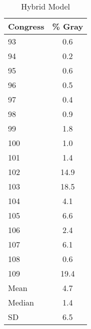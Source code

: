 \documentclass[12pt]{article}
\begin{document}
	\begin{table}[!htbp]
		\begin{center}
			\caption{Hybrid Model}
			\begin{tabular}[!hb]{lc}
				\hline
				Congress &  \% Gray  \\
				\hline
				93 & 0.6 \\ 
				94 & 0.2 \\ 
				95 & 0.6 \\ 
				96 & 0.5 \\ 
			    97 & 0.4 \\ 
				98 & 0.9 \\ 
				99 & 1.8 \\ 
				100 & 1.0 \\ 
				101 & 1.4 \\ 
				102 & 14.9 \\ 
				103 & 18.5 \\ 
				104 & 4.1 \\ 
				105 & 6.6 \\ 
				106 & 2.4 \\ 
				107 & 6.1 \\ 
				108 & 0.6 \\ 
				109 & 19.4 \\ 
				\hline
				Mean & 4.7 \\
				Median & 1.4 \\
				SD & 6.5 \\
				\hline
			\end{tabular}
		\end{center}
	\end{table}
	
	
	

	
	
	
	
	
	
\end{document}
